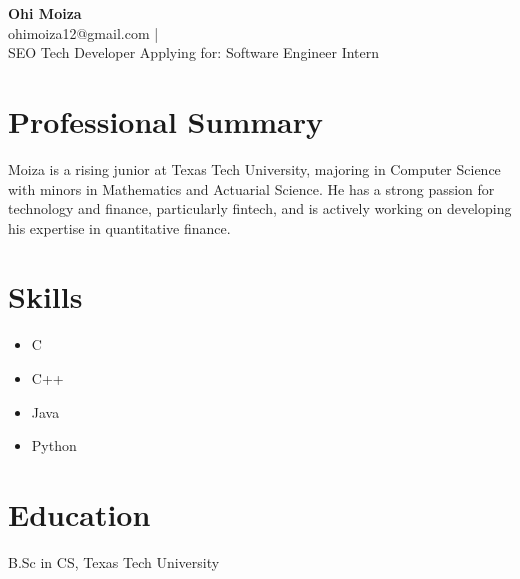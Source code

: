 \documentclass{article}
\begin{document}
\begin{center}
  {\LARGE \textbf{Ohi Moiza}}\\[0.5em]
  ohimoiza12@gmail.com \quad|\\[1em]
  SEO Tech Developer \hfill Applying for: Software Engineer Intern
\end{center}

\section*{Professional Summary}
Moiza is a rising junior at Texas Tech University, majoring in Computer Science with minors in Mathematics and Actuarial Science. He has a strong passion for technology and finance, particularly fintech, and is actively working on developing his expertise in quantitative finance.

\section*{Skills}
\begin{itemize}
  \item C
  \item C++
  \item Java
  \item Python
\end{itemize}

\section*{Education}
B.Sc in CS, Texas Tech University
\end{document}
